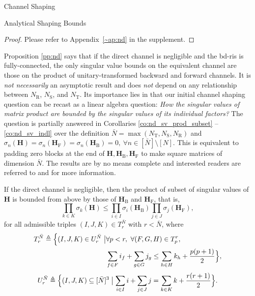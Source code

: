\documentclass[journal]{IEEEtran}
\begin{document}
\begin{section}{Channel Shaping}
\begin{subsection}{Analytical Shaping Bounds}
		\begin{proof}
			Please refer to Appendix~\ref{~ap:nd} in the supplement.
		\end{proof}

		Proposition \ref{pp:nd} says that if the direct channel is negligible and the \gls{bd}-\gls{ris} is fully-connected, the only singular value bounds on the equivalent channel are those on the product of unitary-transformed backward and forward channels.
		It is \emph{not necessarily} an asymptotic result and does \emph{not} depend on any relationship between $N_\mathrm{R}$, $N_\mathrm{S}$, and $N_\mathrm{T}$.
		Its importance lies in that our initial channel shaping question can be recast as a linear algebra question: \emph{How the singular values of matrix product are bounded by the singular values of its individual factors?}
		The question is partially answered in Corollaries \ref{co:nd_sv_prod_subset} -- \ref{co:nd_sv_indl} over the definition $\bar{N} = \max(N_\mathrm{T},N_\mathrm{S},N_\mathrm{R})$ and $\sigma_n(\mathbf{H})=\sigma_n(\mathbf{H}_\mathrm{F})=\sigma_n(\mathbf{H}_\mathrm{B})=0, \ \forall n \in [\bar{N}] \setminus [N]$.
		This is equivalent to padding zero blocks at the end of $\mathbf{H}, \mathbf{H}_\mathrm{B}, \mathbf{H}_\mathrm{F}$ to make square matrices of dimension $\bar{N}$.
		The results are by no means complete and interested readers are referred to \cite[Chapter 16, 24]{Hogben2013} and \cite[Chapter 3]{Horn1994} for more information.


		\begin{corollary}
			\label{co:nd_sv_prod_subset}
			If the direct channel is negligible,
			then the product of subset of singular values of $\mathbf{H}$ is bounded from above by those of $\mathbf{H}_\mathrm{B}$ and $\mathbf{H}_\mathrm{F}$, that is,
			\begin{equation}
				\label{iq:horn}
				\prod_{k \in {K}} \sigma_k(\mathbf{H}) \le \prod_{i \in {I}} \sigma_i(\mathbf{H}_\mathrm{B}) \prod_{j \in {J}} \sigma_j(\mathbf{H}_\mathrm{F}),
			\end{equation}
			for all admissible triples $(I, J, K) \in T_r^{\bar{N}}$ with $r < \bar{N}$, where
			\begin{equation*}
				\begin{split}
					T_r^{\bar{N}} \triangleq \Bigl\{(I, J, K) \in U_r^{\bar{N}} \bigm\vert & \forall p < r, \ \forall (F, G, H) \in T_p^r,                                              \\
																							& \sum_{f \in F} i_f + \sum_{g \in G} j_g \le \sum_{h \in H} k_h + \frac{p(p+1)}{2} \Bigr\},
				\end{split}
			\end{equation*}
			\begin{equation*}
				U_r^{\bar{N}} \triangleq \Bigl\{(I, J, K) \subseteq [\bar{N}]^3 \bigm\vert \sum_{i \in I} i + \sum_{j \in J} j = \sum_{k \in K} k + \frac{r(r+1)}{2}\Bigr\}.
			\end{equation*}
		\end{corollary}


\end{subsection}
\end{section}
\end{document}
